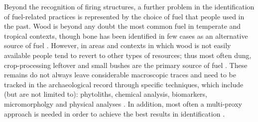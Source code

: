 \documentclass[authoryear,preprint,review,12pt]{elsarticle}
\begin{document}
Beyond the recognition of firing structures, a further problem in the identification of fuel-related practices is represented by the choice of fuel that people used in the past. Wood is beyond any doubt the most common fuel in temperate and tropical contexts, though bone has been identified in few cases as an alternative source of fuel \citep{Beresford-jones2010,Thery-parisot2002}. However, in areas and contexts in which wood is not easily available people tend to revert to other types of resources; thus most often dung, crop-processing leftover and small bushes are the primary source of fuel \citep{Lancelotti2010,Penaa}. These remains do not always leave considerable macroscopic traces and need to be tracked in the archaeological record through specific techniques, which include (but are not limited to): phytoliths, chemical analysis, biomarkers, micromorpholgy and physical analyses \citep{ShahackGross2011}. In addition, most often a multi-proxy approach is needed in order to achieve the best results in identification \citep{GurArieh2013,Lancelotti2012,Linseele2013}.
\end{document}
